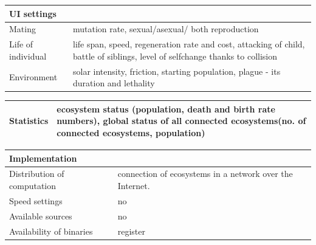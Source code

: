 \documentclass[a4paper,12pt]{report}
\begin{document}
 \vspace{10pt}
 \begin{tabular}{|p{150pt}|p{220pt}|} \hline \textbf{UI settings}&\\ \hline
Mating&mutation rate, sexual/asexual/ both reproduction\\ \hline
Life of individual&life span, speed, regeneration rate and cost, attacking of child, battle of siblings, level of selfchange thanks to collision\\ \hline
Environment&solar intensity, friction, starting population, plague - its duration and lethality\\ \hline
\end{tabular} 

 \vspace{10pt}
 \begin{tabular}{|p{150pt}|p{220pt}|} \hline \textbf{Statistics}&ecosystem status (population, death and birth rate numbers), global status of all connected ecosystems(no. of connected ecosystems, population)\\ \hline
\end{tabular} 

 \vspace{10pt}
 \begin{tabular}{|p{150pt}|p{220pt}|} \hline \textbf{Implementation}&\\ \hline
Distribution of computation&connection of ecosystems in a network over the Internet.\\ \hline
Speed settings&no\\ \hline
Available sources&no\\ \hline
Availability of binaries&register\\ \hline

\end{tabular}
\end{document}
